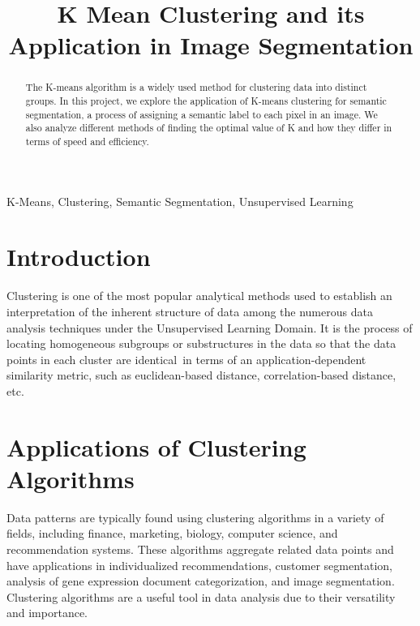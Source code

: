 \documentclass[conference]{IEEEtran}
\begin{document}
\title{K Mean Clustering and its Application in Image Segmentation}


\author{
\and
{}

}

\maketitle

\begin{abstract}

The K-means algorithm is a widely used method for clustering data into distinct groups. In this project, we explore the application of K-means clustering for semantic segmentation, a process of assigning a semantic label to each pixel in an image. We also analyze different methods of finding the optimal value of K and how they differ in terms of speed and efficiency.

\end{abstract}

\begin{IEEEkeywords}
K-Means, Clustering, Semantic Segmentation, Unsupervised Learning
\end{IEEEkeywords}

\section{Introduction}
Clustering is one of the most popular analytical methods used to establish an interpretation of the inherent structure of data among the numerous data analysis techniques under the Unsupervised Learning Domain. It is the process of locating homogeneous subgroups or substructures in the data so that the data points in each cluster are identical in terms of an application-dependent similarity metric, such as euclidean-based distance, correlation-based distance, etc.

\section{Applications of Clustering Algorithms}
Data patterns are typically found using clustering algorithms in a variety of fields, including finance, marketing, biology, computer science, and recommendation systems. These algorithms aggregate related data points and have applications in individualized recommendations, customer segmentation, analysis of gene expression document categorization, and image segmentation. Clustering algorithms are a useful tool in data analysis due to their versatility and importance.
\end{document}

